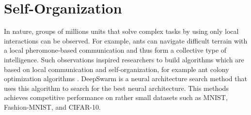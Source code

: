 \section{Self-Organization}


In nature, groups of millions units that solve complex tasks by using only local interactions can be observed.
For example, ants can navigate difficult terrain with a local pheromone-based communication and thus form a collective type of intelligence.
Such observations inspired researchers to build algorithms which are based on local communication and self-organization, for example ant colony optimization algorithms .
DeepSwarm  is a neural architecture search method that uses this algorithm to search for the best neural architecture.
This methods achieves competitive performance on rather small datasets such as MNIST, Fashion-MNIST, and CIFAR-10.


